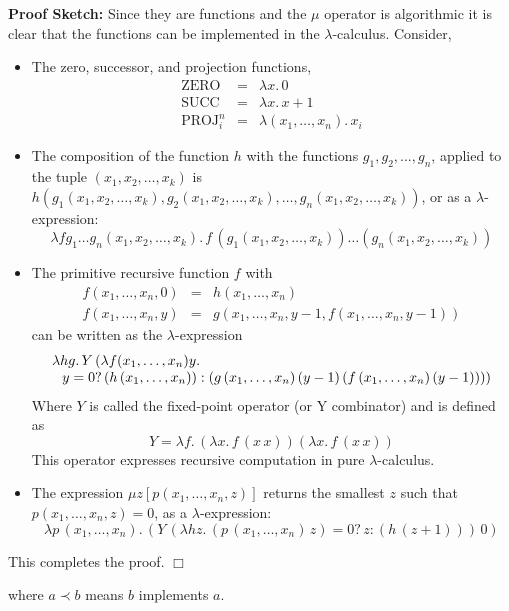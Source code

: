 \documentclass[a4paper,blends,pdf,colorBG,slideColor]{prosper}
\begin{document}
{\bf Proof Sketch:} Since they are functions and the $\mu$ operator is algorithmic it is clear that the functions
can be implemented in the $\lambda$-calculus.  Consider,
\begin{itemize}
\item The zero, successor, and projection functions,
\begin{eqnarray*}
\mbox{ZERO} &=& \lambda x.\, 0\\
\mbox{SUCC} &=& \lambda x.\, x+1\\
\mbox{PROJ}_i^n &=& \lambda(x_1,\ldots,x_n).\, x_i
\end{eqnarray*}

\item The composition of the function $h$ with the functions $g_1, g_2,\dots, g_n$, applied to the tuple $(x_1,x_2,\ldots,x_k)$ is $h(g_1(x_1,x_2,\ldots,x_k),g_2(x_1,x_2,\ldots,x_k),\ldots,g_n(x_1,x_2,\dots,x_k))$,
or as a $\lambda$-expression:
\[
\lambda f g_1\ldots g_n (x_1,x_2,\ldots,x_k).\,f \,(g_1(x_1,x_2,\ldots,x_k))\ldots(g_n(x_1,x_2,\ldots,x_k))
\]


\end{itemize}
\es


\begin{itemize}
\item The primitive recursive function $f$ with
\begin{eqnarray*}
f(x_1,\ldots,x_n,0) &=& h(x_1,\ldots,x_n)\\
f(x_1,\ldots,x_n,y)& = &g(x_1,\ldots,x_n,y-1,f(x_1,\ldots,x_n,y-1))
\end{eqnarray*}
can be written as the $\lambda$-expression
\[
\begin{array}{l}
\lambda h g .\,Y \, (\lambda f (x_1,\ldots,x_n) y. \\
\mbox{\hspace{.1in}}y = 0? \, (h\, (x_1,\ldots,x_n)) : (g\, (x_1,\ldots,x_n) \, (y - 1) \, (f \, (x_1,\ldots,x_n)\,(y-1))))
\end{array}
\]
Where $Y$ is called the fixed-point operator (or Y combinator) and is defined as
\[
Y = \lambda f.\, (\lambda x.\, f\, (x \,x)) (\lambda x.\, f\, (x\, x))
\]
This operator expresses recursive computation in pure $\lambda$-calculus.
\end{itemize}
\es


\begin{itemize}
\item The expression $\mu z[p(x_1,\ldots,x_n,z)]$ returns the smallest $z$ such that $p(x_1,\ldots,x_n,z)=0$, as a $\lambda$-expression:
\[
\lambda p\, (x_1,\ldots,x_n).\, (Y \,(\lambda h z.\, (p\, (x_1,\ldots, x_n)\, z) = 0? \, z : (h\, (z+1)))\, 0)
\]
\end{itemize}
This completes the proof. $\Box$
\es


where $a \prec b$ means $b$ implements $a$.
\es
\end{document}
